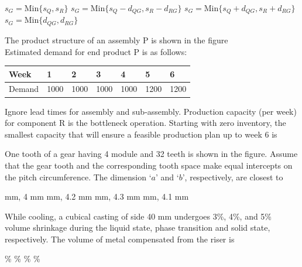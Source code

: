 \documentclass[addpoints,11pt]{exam}
\begin{document}
\begin{questions}
    \begin{choices}
        \choice $s_G = \text{Min}\{s_Q,s_R\}$
        \choice $s_G = \text{Min}\{s_Q-d_{QG},s_R-d_{RG}\}$
        \choice $s_G = \text{Min}\{s_Q+d_{QG},s_R+d_{RG}\}$
        \choice $s_G = \text{Min}\{d_{QG},d_{RG}\}$
    \end{choices}

    \question The product structure of an assembly P is shown in the figure%
    \\Estimated demand for end product P is as follows:\\
    \begin{center}
        \begin{tabular}{|l|l|l|l|l|l|l|}
            \hline
            Week & 1 & 2 & 3 & 4 & 5 & 6\\\hline
            Demand & 1000 & 1000 & 1000 & 1000 & 1200 & 1200\\\hline
        \end{tabular}
    \end{center}
    Ignore lead  times for assembly and sub-assembly. Production capacity (per week) for component R is the bottleneck operation. Starting with zero inventory, the smallest capacity that will ensure a feasible production plan up to week 6 is

    \begin{oneparchoices}
    \end{oneparchoices}

    \question One tooth of a gear having 4 module and 32 teeth is shown in the figure. Assume that the gear tooth and the corresponding tooth space make equal intercepts on the pitch circumference. The dimension `$a$' and `$b$', respectively, are closest to%

    \begin{oneparchoices}
         mm, 4 mm
         mm, 4.2 mm
         mm, 4.3 mm
         mm, 4.1 mm
    \end{oneparchoices}

    \question While cooling, a cubical casting of side 40 mm undergoes 3\%, 4\%, and 5\% volume shrinkage during the liquid state, phase transition and solid state, respectively. The volume of metal compensated from the riser is

    \begin{oneparchoices}
        \%
        \%
        \%
        \%
    \end{oneparchoices}


\end{questions}
\end{document}
